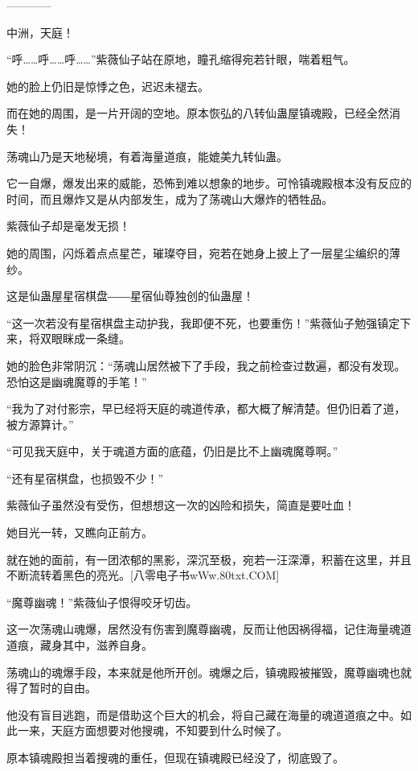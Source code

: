 
\begin{this_body}

------------

中洲，天庭！

“呼……呼……呼……”紫薇仙子站在原地，瞳孔缩得宛若针眼，喘着粗气。

她的脸上仍旧是惊悸之色，迟迟未褪去。

而在她的周围，是一片开阔的空地。原本恢弘的八转仙蛊屋镇魂殿，已经全然消失！

荡魂山乃是天地秘境，有着海量道痕，能媲美九转仙蛊。

它一自爆，爆发出来的威能，恐怖到难以想象的地步。可怜镇魂殿根本没有反应的时间，而且爆炸又是从内部发生，成为了荡魂山大爆炸的牺牲品。

紫薇仙子却是毫发无损！

她的周围，闪烁着点点星芒，璀璨夺目，宛若在她身上披上了一层星尘编织的薄纱。

这是仙蛊屋星宿棋盘――星宿仙尊独创的仙蛊屋！

“这一次若没有星宿棋盘主动护我，我即便不死，也要重伤！”紫薇仙子勉强镇定下来，将双眼眯成一条缝。

她的脸色非常阴沉：“荡魂山居然被下了手段，我之前检查过数遍，都没有发现。恐怕这是幽魂魔尊的手笔！”

“我为了对付影宗，早已经将天庭的魂道传承，都大概了解清楚。但仍旧着了道，被方源算计。”

“可见我天庭中，关于魂道方面的底蕴，仍旧是比不上幽魂魔尊啊。”

“还有星宿棋盘，也损毁不少！”

紫薇仙子虽然没有受伤，但想想这一次的凶险和损失，简直是要吐血！

她目光一转，又瞧向正前方。

就在她的面前，有一团浓郁的黑影，深沉至极，宛若一汪深潭，积蓄在这里，并且不断流转着黑色的亮光。[八零电子书wWw.80txt.COM]

“魔尊幽魂！”紫薇仙子恨得咬牙切齿。

这一次荡魂山魂爆，居然没有伤害到魔尊幽魂，反而让他因祸得福，记住海量魂道道痕，藏身其中，滋养自身。

荡魂山的魂爆手段，本来就是他所开创。魂爆之后，镇魂殿被摧毁，魔尊幽魂也就得了暂时的自由。

他没有盲目逃跑，而是借助这个巨大的机会，将自己藏在海量的魂道道痕之中。如此一来，天庭方面想要对他搜魂，不知要到什么时候了。

原本镇魂殿担当着搜魂的重任，但现在镇魂殿已经没了，彻底毁了。


\end{this_body}
